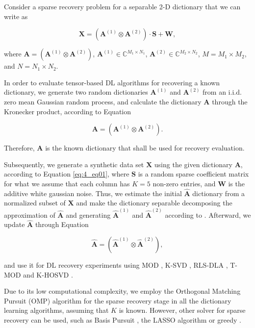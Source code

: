 Consider a sparse recovery problem for a separable 2-D dictionary that we can write as

\begin{equation}\label{eq:4_eq02}
	\textbf{X} = (\textbf{A}^{(1)} \otimes \textbf{A}^{(2)}) \cdot \textbf{S} + \textbf{W},
\end{equation}

where $\textbf{A} = (\textbf{A}^{(1)} \otimes \textbf{A}^{(2)})$, $\textbf{A}^{(1)} \in \mathbb{C}^{M_1 \times N_1}$, $\textbf{A}^{(2)} \in \mathbb{C}^{M_2 \times N_2}$, $M = M_1 \times M_2$, and $N = N_1 \times N_2$.

In order to evaluate tensor-based DL algorithms for recovering a known dictionary, we generate two random dictionaries $\textbf{A}^{(1)}$ and $\textbf{A}^{(2)}$ from an i.i.d. zero mean Gaussian random process, and calculate the dictionary $\textbf{A}$ through the Kronecker product, according to Equation

\begin{equation}\label{eq:4_eq03}
	\textbf{A} = (\textbf{A}^{(1)} \otimes \textbf{A}^{(2)}).
\end{equation}

Therefore, $\textbf{A}$ is the known dictionary that shall be used for recovery evaluation. 

Subsequently, we generate a synthetic data set $\textbf{X}$ using the given dictionary $\textbf{A}$, according to Equation \ref{eq:4_eq01}, where $\textbf{S}$ is a random sparse coefficient matrix for what we assume that each column has $K = 5$ non-zero entries, and $\textbf{W}$ is the additive white gaussian noise. Thus, we estimate the initial $\hat{\textbf{A}}$ dictionary from a normalized subset of $\textbf{X}$ and make the dictionary separable decomposing the approximation of $\hat{\textbf{A}}$ and generating $\hat{\textbf{A}}^{(1)}$ and $\hat{\textbf{A}}^{(2)}$ according to \cite{van1993approximation}. Afterward, we update $\hat{\textbf{A}}$ through Equation

\begin{equation}\label{eq:4_eq04}
	\hat{\textbf{A}} = (\hat{\textbf{A}}^{(1)} \otimes \hat{\textbf{A}}^{(2)}),
\end{equation}

and use it for DL recovery experiments using MOD \cite{engan1999method}, K-SVD \cite{aharon2006rm}, RLS-DLA \cite{skretting2010recursive}, T-MOD \cite{roemer2014tensor} and K-HOSVD \cite{roemer2014tensor}. 

Due to its low computational complexity, we employ the Orthogonal Matching Pursuit (OMP) algorithm\cite{davis1997adaptive} for the sparse recovery stage in all the dictionary learning algorithms, assuming that $K$ is known. However, other solver for sparse recovery can be used, such as Basis Pursuit \cite{chen2001atomic}, the LASSO algorithm \cite{tibshirani1996regression} or greedy \cite{davis1997adaptive}.

